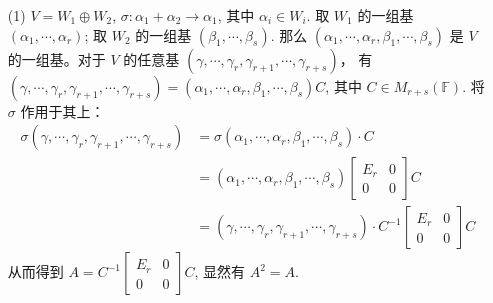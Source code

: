 \documentclass{article}
\begin{document}
\begin{spacing}{1.5}
\begin{itemize}
    \begin{itemize}
        \item [(1)] $V = W_1 \oplus W_2$, $\sigma: \alpha_1 + \alpha_2 \to \alpha_1$, 其中 $\alpha_i\in W_i$. 取 $W_1$ 的一组基 $(\alpha_1, \cdots, \alpha_r)$; 取 $W_2$ 的一组基 $(\beta_1, \cdots, \beta_s)$. 那么 $(\alpha_1, \cdots, \alpha_r, \beta_1, \cdots, \beta_s)$ 是 $V$ 的一组基。对于 $V$ 的任意基 $(\gamma,\cdots, \gamma_r, \gamma_{r+1},\cdots, \gamma_{r+s})$， 有 $(\gamma,\cdots, \gamma_r, \gamma_{r+1},\cdots, \gamma_{r+s}) = (\alpha_1, \cdots, \alpha_r, \beta_1, \cdots, \beta_s) C$, 其中 $C\in M_{r+s}(\mathbb{F})$. 将 $\sigma$ 作用于其上：$$\begin{array}{ll}\sigma (\gamma,\cdots, \gamma_r, \gamma_{r+1},\cdots, \gamma_{r+s}) &= \sigma (\alpha_1, \cdots, \alpha_r, \beta_1, \cdots, \beta_s)\cdot C \\ &= (\alpha_1, \cdots, \alpha_r, \beta_1, \cdots, \beta_s) \left[\begin{array}{cc}E_r&0\\0&0\end{array}\right]C\\&=(\gamma,\cdots, \gamma_r, \gamma_{r+1},\cdots, \gamma_{r+s})\cdot C^{-1} \left[\begin{array}{cc}E_r&0\\0&0\end{array}\right]C\end{array}$$
        从而得到 $A = C^{-1} \left[\begin{array}{cc}E_r&0\\0&0\end{array}\right] C$, 显然有 $A^2 = A$.


\end{itemize}
\end{itemize}
\end{spacing}
\end{document}
